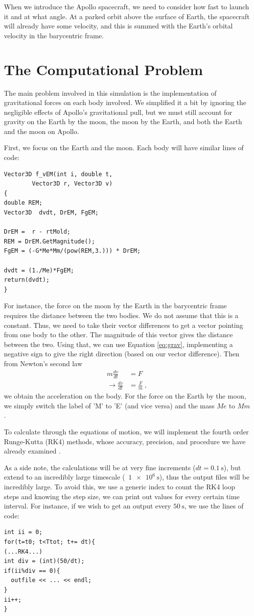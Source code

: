 \documentclass[aps,prl,twocolumn,superscriptaddress]{revtex4-1}
\begin{document}
When we introduce the Apollo spacecraft, we need to consider how fast to launch it and at what angle. At a parked orbit above the surface of Earth, the spacecraft will already have some velocity, and this is summed with the Earth's orbital velocity in the barycentric frame.

\section{The Computational Problem}
The main problem involved in this simulation is the implementation of gravitational forces on each body involved. We simplified it a bit by ignoring the negligible effects of Apollo's gravitational pull, but we must still account for gravity on the Earth by the moon, the moon by the Earth, and both the Earth and the moon on Apollo.

First, we focus on the Earth and the moon. Each body will have similar lines of code:
\begin{lstlisting}
Vector3D f_vEM(int i, double t, 
		Vector3D r, Vector3D v)
{
double REM;
Vector3D  dvdt, DrEM, FgEM;

DrEM =  r - rtMold;
REM = DrEM.GetMagnitude();
FgEM = (-G*Me*Mm/(pow(REM,3.))) * DrEM;

dvdt = (1./Me)*FgEM;
return(dvdt);
}
\end{lstlisting}
For instance, the force on the moon by the Earth in the barycentric frame requires the distance between the two bodies. We do not assume that this is a constant. Thus, we need to take their vector differences to get a vector pointing from one body to the other. The magnitude of this vector gives the distance between the two. Using that, we can use Equation \ref{eq:grav}, implementing a negative sign to give the right direction (based on our vector difference). Then from Newton's second law
\begin{align}
m \frac{dv}{dt} &= F 	\label{eq:2nd} \\
\rightarrow \frac{dv}{dt} &= \frac{F}{m} ~, \label{eq:dvdt}
\end{align}
we obtain the acceleration on the body. For the force on the Earth by the moon, we simply switch the label of 'M' to 'E' (and vice versa) and the mass $Me$ to $Mm$.

To calculate through the equations of motion, we will implement the fourth order Runge-Kutta (RK4) methods, whose accuracy, precision, and procedure we have already examined \cite{RK4}. 

As a side note, the calculations will be at very fine increments ($dt = \SI{0.1}{\s}$), but extend to an incredibly large timescale (~$\SI{1e6}{\s}$), thus the output files will be incredibly large. To avoid this, we use a generic index to count the RK4 loop steps and knowing the step size, we can print out values for every certain time interval. For instance, if we wish to get an output every $\SI{50}{\s}$, we use the lines of code:
\begin{lstlisting}
int ii = 0;
for(t=t0; t<Ttot; t+= dt){
(...RK4...)
int div = (int)(50/dt);
if(ii%div == 0){
  outfile << ... << endl;
}
ii++;
}
\end{lstlisting}
\end{document}
